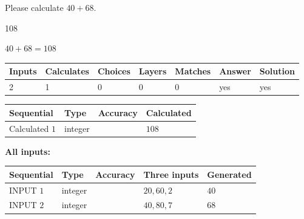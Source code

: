 \documentclass[12pt]{article}
\begin{document}
  
 
Please calculate $ %
40 +  %
68 $.
 
 
 
\noindent{}
 
 

108
 
 
\noindent{}
 
 

 
 
 
\noindent{}
 
 

$ %
40 +  %
68=   %
108$
 
 
\noindent{}
 
 

 
   
   
   
   
\noindent\begin{tabular}{|l|l|l|l|l|l|l|}
 \hline
Inputs & Calculates & Choices & Layers & Matches & Answer & Solution \\ \hline
 2  & 
 1  & 
 0
  & 
 0  & 
 0  & 
  yes & 
  yes 
  \\ \hline
 \end{tabular}
   
   
   
   
\noindent{}
   
   
  
  
\noindent\begin{tabular}{|l|l|l|l|}
\hline
 Sequential & Type & Accuracy & Calculated \\ 
\hline
 
 
  Calculated $  1 $ & integer &  & 
  $ 108 $ 
 \\  \hline  
 \end{tabular}
   
   
   
   
\noindent\vspace{0.1in}\hspace{-0.08in} {\textbf{\Large{All inputs: }}}
   
   
  
  
\noindent\begin{tabular}{|l|l|l|l|l|}
\hline
 Sequential & Type & Accuracy & Three inputs & Generated \\ 
\hline
 
 
  INPUT $  1 $ & integer &  & $
 20
 , 
 60
 , 
 2
 $ & $ 40 $ 
 \\  \hline  
 
 
  INPUT $  2 $ & integer &  & $
 40
 , 
 80
 , 
 7
 $ & $ 68 $ 
 \\  \hline  
 \end{tabular}
   
\end{document}
